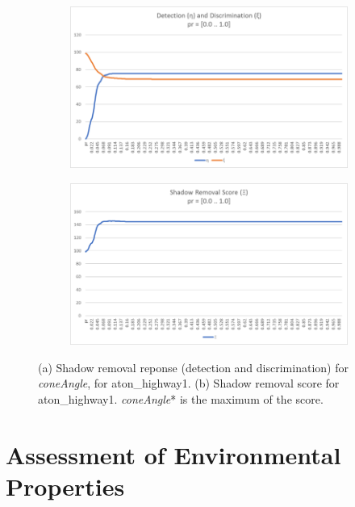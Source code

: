 \begin{figure}
  \centering
  \begin{subfigure}{.8\linewidth}
  \includegraphics[width=1\linewidth]{figures/sensitive_param.jpg}
  \caption{}
\end{subfigure}
\hfill
\begin{subfigure}{.8\linewidth}
  \includegraphics[width=1\linewidth]{figures/sensitive_param_score.jpg}
  \caption{}
\end{subfigure}

\caption{(a) Shadow removal reponse (detection and discrimination) for \textit{coneAngle}, for aton\_highway1. (b) Shadow removal score for aton\_highway1. \textit{coneAngle}* is the maximum of the score.}
\label{fig:coneAngle_iterate}
\end{figure}

\FloatBarrier
\section{Assessment of Environmental Properties} \label{section:envassess}

